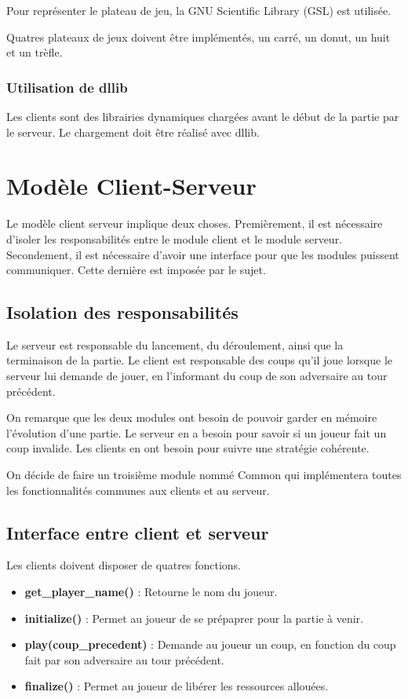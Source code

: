 \documentclass{article}
\begin{document}
Pour repr\'esenter le plateau de jeu, la GNU Scientific Library (GSL) est utilis\'ee.

Quatres plateaux de jeux doivent \^etre impl\'ement\'es, un carr\'e, un donut, un huit et un tr\`efle.

\subsubsection{Utilisation de dllib}

Les clients sont des librairies dynamiques charg\'ees avant le d\'ebut de la partie par le serveur.
Le chargement doit \^etre r\'ealis\'e avec dllib.

\section{Mod\`ele Client-Serveur}

Le mod\`ele client serveur implique deux choses.
Premi\`erement, il est n\'ecessaire d'isoler les responsabilit\'es entre le module client et le module serveur.
Secondement, il est n\'ecessaire d'avoir une interface pour que les modules puissent communiquer.
Cette derni\`ere est impos\'ee par le sujet.

\subsection{Isolation des responsabilit\'es}

Le serveur est responsable du lancement, du d\'eroulement, ainsi que la terminaison de la partie.
Le client est responsable des coups qu'il joue lorsque le serveur lui demande de jouer, 
en l'informant du coup de son adversaire au tour pr\'ec\'edent.

On remarque que les deux modules ont besoin de pouvoir garder en m\'emoire l'\'evolution d'une partie.
Le serveur en a besoin pour savoir si un joueur fait un coup invalide.
Les clients en ont besoin pour suivre une strat\'egie coh\'erente.

On d\'ecide de faire un troisi\`eme module nomm\'e Common qui impl\'ementera toutes les fonctionnalit\'es communes 
aux clients et au serveur.

\subsection{Interface entre client et serveur}

Les clients doivent disposer de quatres fonctions.
\begin{itemize}
    \item \textbf{get\_player\_name()} : Retourne le nom du joueur.
    \item \textbf{initialize()} : Permet au joueur de se pr\'epaprer pour la partie \`a venir.
    \item \textbf{play(coup\_precedent)} : Demande au joueur un coup, en fonction 
    du coup fait par son adversaire au tour pr\'ec\'edent.
    \item \textbf{finalize()} : Permet au joueur de lib\'erer les ressources allou\'ees.
\end{itemize}
\end{document}
